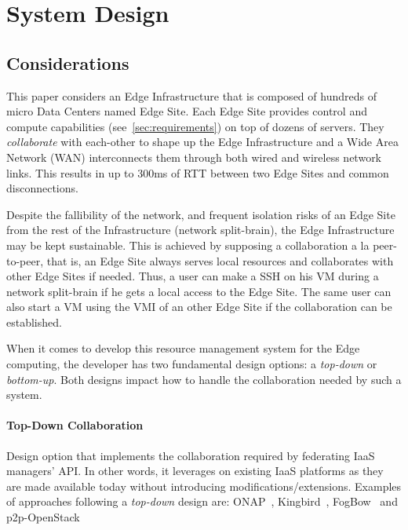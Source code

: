 


\section{System Design}
\label{system_design_considerations}
\subsection{Considerations}
\label{design_considerations}
This paper considers an Edge Infrastructure that is composed of
hundreds of micro Data Centers named Edge Site. Each Edge Site
provides control and compute capabilities (see~\ref{sec:requirements})
on top of dozens of servers. They \emph{collaborate} with each-other
to shape up the Edge Infrastructure and a Wide Area Network (WAN)
interconnects them through both wired and wireless network links. This
results in up to 300ms of RTT between two Edge Sites and common
disconnections.

Despite the fallibility of the network, and frequent isolation risks
of an Edge Site from the rest of the Infrastructure (\ie network
split-brain), the Edge Infrastructure may be kept sustainable. This is
achieved by supposing a collaboration a la peer-to-peer, that is, an
Edge Site always serves local resources and collaborates with other
Edge Sites if needed. Thus, a user can make a SSH on his VM during a
network split-brain if he gets a local access to the Edge Site. The
same user can also start a VM using the VMI of an other Edge Site if
the collaboration can be established.

When it comes to develop this resource management system for the Edge
computing, the developer has two fundamental design options: a \emph{top-down} or
\emph{bottom-up}. Both designs impact how to handle the
collaboration needed by such a system.

\paragraph{Top-Down Collaboration}
Design option that implements the collaboration required by
federating IaaS managers' API. In other words, it leverages on existing IaaS platforms as they are made available today without introducing modifications/extensions. Examples of approaches following a \emph{top-down} design are: ONAP~\cite{onap}, Kingbird~\cite{kingbird}, FogBow~\cite{brasileiro2016fogbow} and p2p-OpenStack~\cite{ericsson-p2p}


